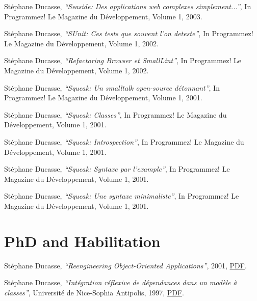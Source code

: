 \documentclass{article}
\newcommand{\czauthors}[1]{#1}
\newcommand{\cztitle}[1]{\emph{``#1''}}
\newcommand{\czjournal}[1]{#1}
\begin{document}
\begin{itemize}
	\pub  \czauthors{St\'ephane Ducasse},  \cztitle{Seaside: Des applications web complexes simplement...},  In \czjournal{Programmez! Le Magazine du D\'eveloppement}, Volume 1, 2003.

	\pub  \czauthors{St\'ephane Ducasse},  \cztitle{SUnit: Ces tests que souvent l'on deteste},  In \czjournal{Programmez! Le Magazine du D\'eveloppement}, Volume 1, 2002.

	\pub  \czauthors{St\'ephane Ducasse},  \cztitle{Refactoring Browser et SmallLint},  In \czjournal{Programmez! Le Magazine du D\'eveloppement}, Volume 1, 2002.

	\pub  \czauthors{St\'ephane Ducasse},  \cztitle{Squeak: Un smalltalk open-source d\'etonnant},  In \czjournal{Programmez! Le Magazine du D\'eveloppement}, Volume 1, 2001.

	\pub  \czauthors{St\'ephane Ducasse},  \cztitle{Squeak: Classes},  In \czjournal{Programmez! Le Magazine du D\'eveloppement}, Volume 1, 2001.

	\pub  \czauthors{St\'ephane Ducasse},  \cztitle{Squeak: Introspection},  In \czjournal{Programmez! Le Magazine du D\'eveloppement}, Volume 1, 2001.

	\pub  \czauthors{St\'ephane Ducasse},  \cztitle{Squeak: Syntaxe par l'example},  In \czjournal{Programmez! Le Magazine du D\'eveloppement}, Volume 1, 2001.

	\pub  \czauthors{St\'ephane Ducasse},  \cztitle{Squeak: Une syntaxe minimaliste},  In \czjournal{Programmez! Le Magazine du D\'eveloppement}, Volume 1, 2001.

\end{itemize}\section{PhD and Habilitation}

\begin{itemize}

	\pub  \czauthors{St\'ephane Ducasse},  \cztitle{Reengineering Object-Oriented Applications}, 2001, \href{http://rmod-files.lille.inria.fr/Team/Texts/Papers/Duca01cHab.pdf}{PDF}.

	\pub  \czauthors{St\'ephane Ducasse},  \cztitle{Int\'egration r\'eflexive de d\'ependances dans un mod\`ele \`a classes}, Universit\'e de Nice-Sophia Antipolis, 1997, \href{http://rmod-files.lille.inria.fr/Team/Texts/Papers/Duca97aPhD.pdf}{PDF}.

\end{itemize}
\end{document}
